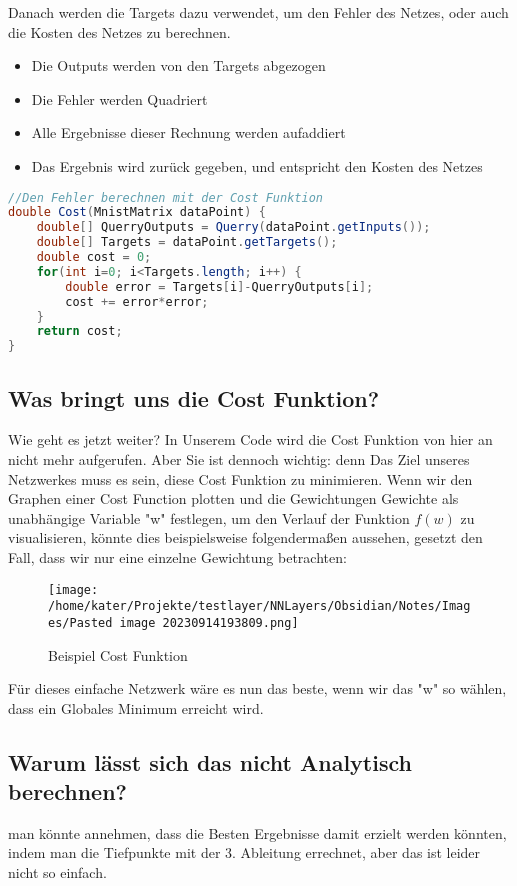 \documentclass[12pt]{article}
\begin{document}
Danach werden die Targets dazu verwendet, um den Fehler des Netzes, oder auch die Kosten des Netzes zu berechnen. 
\begin{itemize}
\item Die Outputs werden von den Targets abgezogen
\item Die Fehler werden Quadriert
\item Alle Ergebnisse dieser Rechnung werden aufaddiert
\item Das Ergebnis wird zurück gegeben, und entspricht den Kosten des Netzes
\end{itemize}
\begin{lstlisting}[language=Java]
//Den Fehler berechnen mit der Cost Funktion
double Cost(MnistMatrix dataPoint) {
    double[] QuerryOutputs = Querry(dataPoint.getInputs());
    double[] Targets = dataPoint.getTargets();
    double cost = 0;
    for(int i=0; i<Targets.length; i++) {
        double error = Targets[i]-QuerryOutputs[i];
        cost += error*error;
    }
    return cost;
}
\end{lstlisting}\subsection{ Was bringt uns die Cost Funktion?}Wie geht es jetzt weiter? In Unserem Code wird die Cost Funktion von hier an nicht mehr aufgerufen. Aber Sie ist dennoch wichtig: denn Das Ziel unseres Netzwerkes muss es sein, diese Cost Funktion zu minimieren. Wenn wir den Graphen einer Cost Function plotten und die Gewichtungen Gewichte als unabhängige Variable "w" festlegen, um den Verlauf der Funktion $f(w)$ zu visualisieren, könnte dies beispielsweise folgendermaßen aussehen, gesetzt den Fall, dass wir nur eine einzelne Gewichtung betrachten:
\begin{figure}[H]
\centering
\texttt{[image: /home/kater/Projekte/testlayer/NNLayers/Obsidian/Notes/Images/Pasted image 20230914193809.png]}
\caption{Beispiel Cost Funktion}
\label{Was kommt hier rein?}\end{figure}Für dieses einfache Netzwerk wäre es nun das beste, wenn wir das "w" so wählen, dass ein Globales Minimum erreicht wird. \subsection{ Warum lässt sich das nicht Analytisch berechnen?}man könnte annehmen, dass die Besten Ergebnisse damit erzielt werden könnten, indem man die Tiefpunkte mit der 3. Ableitung errechnet, aber das ist leider nicht so einfach.
\end{document}
